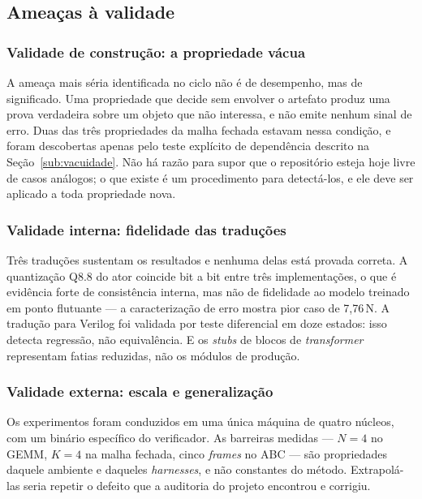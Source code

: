 \subsection{Ameaças à validade}

\subsubsection{Validade de construção: a propriedade vácua}

A ameaça mais séria identificada no ciclo não é de desempenho, mas de significado. Uma
propriedade que decide sem envolver o artefato produz uma prova verdadeira sobre um objeto
que não interessa, e não emite nenhum sinal de erro. Duas das três propriedades da malha
fechada estavam nessa condição, e foram descobertas apenas pelo teste explícito de
dependência descrito na Seção~\ref{sub:vacuidade}. Não há razão para supor que o repositório
esteja hoje livre de casos análogos; o que existe é um procedimento para detectá-los, e ele
deve ser aplicado a toda propriedade nova.

\subsubsection{Validade interna: fidelidade das traduções}

Três traduções sustentam os resultados e nenhuma delas está provada correta. A quantização
Q8.8 do ator coincide bit a bit entre três implementações, o que é evidência forte de
consistência interna, mas não de fidelidade ao modelo treinado em ponto flutuante --- a
caracterização de erro mostra pior caso de 7,76\,N. A tradução para Verilog foi validada por
teste diferencial em doze estados: isso detecta regressão, não equivalência. E os
\textit{stubs} de blocos de \textit{transformer} representam fatias reduzidas, não os módulos
de produção.

\subsubsection{Validade externa: escala e generalização}

Os experimentos foram conduzidos em uma única máquina de quatro núcleos, com um binário
específico do verificador. As barreiras medidas --- $N{=}4$ no GEMM, $K{=}4$ na malha fechada,
cinco \textit{frames} no ABC --- são propriedades daquele ambiente e daqueles
\textit{harnesses}, e não constantes do método. Extrapolá-las seria repetir o defeito que a
auditoria do projeto encontrou e corrigiu.

